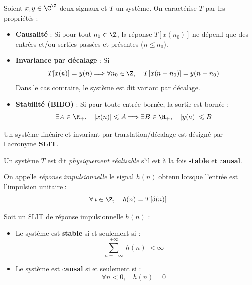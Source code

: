 \begin{prop}
    Soient $x, y \in \C^\Z$ deux signaux et $T$ un système. On caractérise $T$ par les propriétés : 
    \begin{itemize}
        \item \textbf{Causalité} : Si pour tout $n_0 \in \Z$, la réponse $T[x(n_0)]$ 
        ne dépend que des entrées et/ou sorties passées et présentes ($n \leqslant n_0$). 
        \item \textbf{Invariance par décalage} : Si 
            \begin{equation}
                T[x(n)] = y(n) \Longrightarrow \forall n_0 \in \Z, \quad T[x(n - n_0)] = y(n - n_0) 
            \end{equation}
        Dans le cas contraire, le système est dit variant par décalage.
        \item \textbf{Stabilité (BIBO)} : Si pour toute entrée bornée, la sortie est bornée : 
            \begin{equation}
                \exists A \in \R_+, \quad |x(n)| \leqslant A \Longrightarrow \exists B \in \R_+, \quad |y(n)| \leqslant B 
            \end{equation}
    \end{itemize}
\end{prop}

Un système linéaire et invariant par translation/décalage est désigné par l'acronyme \textbf{SLIT}.

\begin{definition}
    Un système $T$ est dit \emph{physiquement réalisable} s'il est à la fois \textbf{stable} et \textbf{causal}. 
\end{definition}

\begin{definition}
    On appelle \emph{réponse impulsionnelle} le signal $h(n)$ obtenu lorsque l'entrée est l'impulsion unitaire :
        \begin{equation}
            \forall n \in \Z, \quad h(n) = T[ \delta(n)]
        \end{equation}
\end{definition}

\begin{proposition}
    Soit un SLIT de réponse impulsionnelle $h(n)$ :
    \begin{itemize}
        \item Le système est \textbf{stable} si et seulement si :
            \begin{equation}
                \sum_{n=-\infty}^{+\infty} |h(n)| < \infty
            \end{equation}
        \item Le système est \textbf{causal} si et seulement si :
            \begin{equation}
                \forall n < 0, \quad h(n) = 0
            \end{equation}
    \end{itemize}
\end{proposition}

